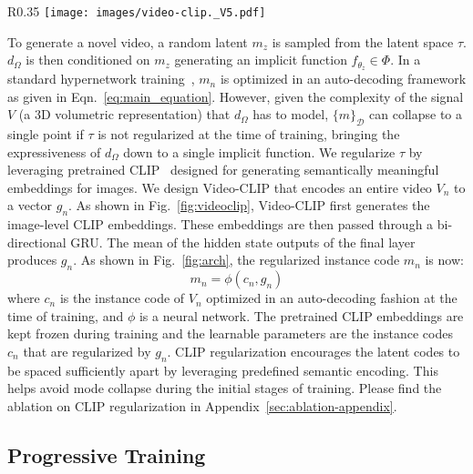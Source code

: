 \documentclass[10pt]{article} \usepackage[accepted]{tmlr}
\begin{document}
\begin{wrapfigure}[17]{R}{0.35\textwidth}
\centering
\vspace{-15pt}
\texttt{[image: images/video-clip.\_V5.pdf]}
\caption{\textbf{Video-CLIP}: Encoding a video $V_n$ to a latent vector $g_n$ by using image-level CLIP encodings.}
\label{fig:videoclip}
\end{wrapfigure}
To generate a novel video, a random latent $m_z$ is sampled from the latent space $\tau$. $d_\Omega$ is then conditioned on $m_z$ generating an implicit function $f_{\theta_z} \in \Phi$. 
In a standard hypernetwork training~\cite{3dhypernet2, lfns, deepsdf, siren}, $m_n$ is optimized in an auto-decoding framework as given in Eqn.~\ref{eq:main_equation}. However, given the complexity of the signal $V$ (a $3$D volumetric representation) that $d_\Omega$ has to model, $\{m\}_{\mathcal{D}}$ can collapse to a single point if $\tau$ is not regularized at the time of training, bringing the expressiveness of $d_\Omega$ down to a single implicit function. 
We regularize $\tau$ by 
leveraging pretrained CLIP~\cite{clip} designed for generating semantically meaningful embeddings for images. We design Video-CLIP that encodes an entire video $V_n$ to a vector $g_n$.
As shown in Fig.~\ref{fig:videoclip}, Video-CLIP first generates the image-level CLIP embeddings. These embeddings are then passed through a bi-directional GRU. The mean of the hidden state outputs of the final layer produces $g_n$. As shown in Fig.~\ref{fig:arch}, the regularized instance code $m_n$ is now:
\begin{equation}
    m_n = \phi(c_n, g_n) 
\end{equation}
where $c_n$ is the instance code of $V_n$ optimized in an auto-decoding fashion at the time of training, and $\phi$ is a neural network. The pretrained CLIP embeddings are kept frozen during training and the learnable parameters are the instance codes $c_n$ that are regularized by $g_n$. CLIP regularization encourages the latent codes to be spaced sufficiently apart by leveraging predefined semantic encoding. This helps avoid mode collapse during the initial stages of training. 
Please find the ablation on CLIP regularization in Appendix~\ref{sec:ablation-appendix}.

\subsection{Progressive Training}
\label{sec:progressive-training}
\end{document}
